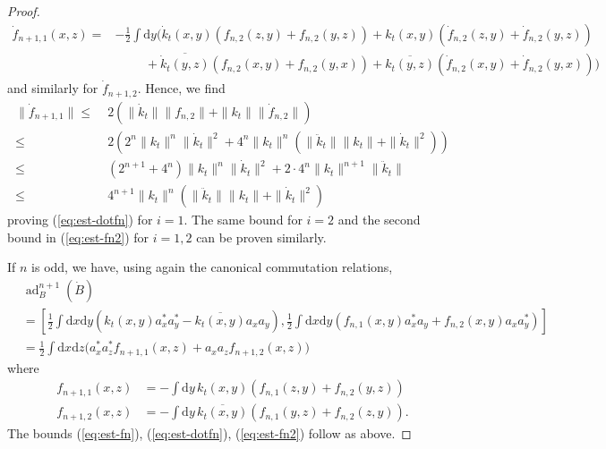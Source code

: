\documentclass[11pt,a4paper]{article}
\newcommand{\ad}{\operatorname{ad}}	%
\newcommand{\di}{\textrm{d}}		%
\newcommand{\cc}[1]{\overline{#1}}	%
\begin{document}
\begin{proof}
\[\begin{split}
\dot{f}_{n+1,1}(x,z) = &-\frac{1}{2} \int \di y \Big( \dot{k}_t (x,y) \left( f_{n,2}(z,y) + f_{n,2}(y,z) \right) + k_t (x,y) \left( \dot{f}_{n,2} (z,y) + \dot{f}_{n,2} (y,z) \right) \\ &\hspace{1cm} + \cc{\dot{k}_t (y,z)} \left( f_{n,2}(x,y) + f_{n,2}(y,x)\right) + \cc{k_t (y,z)} \left( \dot{f}_{n,2}(x,y) + \dot{f}_{n,2}(y,x)\right) \Big) \end{split}\]
and similarly for $\dot{f}_{n+1,2}$. Hence, we find
\[ \begin{split} 
\| \dot{f}_{n+1,1} \| \leq \; &2 \left( \| \dot{k}_t \| \| f_{n,2} \| + \| k_t \| \| \dot{f}_{n,2} \| \right)  \\
\leq \; & 2 \left( 2^n \| k_t \|^n \| \dot{k}_t \|^2 + 4^n \| k_t \|^n \left( \| \ddot k_t \| \| k_t \| + \| \dot k_t \|^2 \right) \right) \\
\leq \; & (2^{n+1} + 4^n) \| k_t \|^n \| \dot k_t \|^2 + 2 \cdot 4^n \| k_t \|^{n+1} \| \ddot k_t \| \\ \leq \; & 4^{n+1} \| k_t \|^n \left( \| \ddot k_t \| \| k_t \| + \| \dot k_t \|^2 \right)
\end{split} \]
proving (\ref{eq:est-dotfn}) for $i = 1$. The same bound for $i=2$ and the second bound in (\ref{eq:est-fn2}) for $i=1,2$ can be proven similarly. 

If $n$ is odd, we have, using again the canonical commutation relations, 
\begin{align*}
& \ad^{n+1}_B(\dot B)\\
& = \left[ \frac{1}{2}\int \di x \di y \left( k_t (x,y)a^\ast_x a^\ast_y - \cc{k_t (x,y)} a_x a_y \right) , \frac{1}{2}\int \di x\di y \left( f_{n,1}(x,y) a^\ast_x a_y + f_{n,2}(x,y) a_x a^\ast_y \right) \right] \\
& = \frac{1}{2} \int \di x\di z \big( a^\ast_x a^\ast_z f_{n+1,1}(x,z) + a_x a_z f_{n+1,2}(x,z) \big)
\end{align*}
where
\begin{equation}
\label{eq:odd}
\begin{split}
f_{n+1,1}(x,z) & = - \int \di y\, k_t (x,y)\left( f_{n,1}(z,y) + f_{n,2}(y,z) \right) \\
f_{n+1,2}(x,z) & = - \int \di y\, \cc{k_t (x,y)}\left( f_{n,1}(y,z) + f_{n,2}(z,y) \right).
\end{split}
\end{equation}
The bounds (\ref{eq:est-fn}), (\ref{eq:est-dotfn}), (\ref{eq:est-fn2}) follow as above.
\end{proof}
\end{document}
